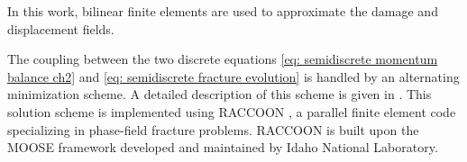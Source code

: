 In this work, bilinear finite elements are used to approximate the damage and displacement fields. 

The coupling between the two discrete equations \eqref{eq: semidiscrete momentum balance ch2} and \eqref{eq: semidiscrete fracture evolution} is handled by an alternating minimization scheme. A detailed description of this scheme is given in \cite{hu2020phase}.   This solution scheme is implemented using RACCOON \cite{raccoon}, a  parallel finite element code specializing in phase-field fracture problems. RACCOON is built upon the MOOSE framework \cite{gaston2009moose, permann2020moose} developed and maintained by  Idaho National Laboratory.

